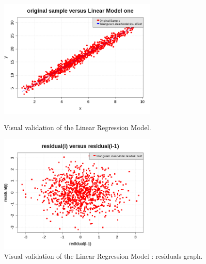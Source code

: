                  \begin{figure}[H]
                   \begin{minipage}{8cm}
                     \begin{center}
                       \includegraphics[width=8cm]{Figures/linearRegression_Graph.png}
                       \caption{Visual validation of the Linear Regression Model.}
                       \label{LMGood}
                     \end{center}
                   \end{minipage}
                   \hfill
                   \begin{minipage}{8cm}
                     \begin{center}
                       \includegraphics[width=8cm]{Figures/linearRegression_residualGraph.png}
                       \caption{Visual validation of the Linear Regression Model : residuals graph.}
                       \label{LMResidualGood}
                     \end{center}
                   \end{minipage}
                 \end{figure}




